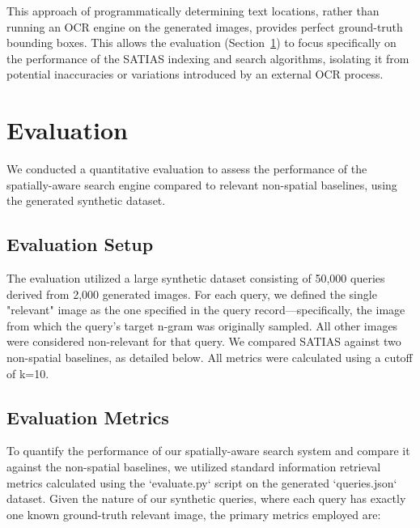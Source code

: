 \documentclass[sigconf,screen]{acmart}
\begin{document}
This approach of programmatically determining text locations, rather than running an OCR engine on the generated images, provides perfect ground-truth bounding boxes. This allows the evaluation (Section~\ref{sec:evaluation}) to focus specifically on the performance of the SATIAS indexing and search algorithms, isolating it from potential inaccuracies or variations introduced by an external OCR process.

\section{Evaluation}
\label{sec:evaluation}

We conducted a quantitative evaluation to assess the performance of the spatially-aware search engine compared to relevant non-spatial baselines, using the generated synthetic dataset.

\subsection{Evaluation Setup}

The evaluation utilized a large synthetic dataset consisting of 50,000 queries derived from 2,000 generated images. For each query, we defined the single "relevant" image as the one specified in the query record—specifically, the image from which the query's target n-gram was originally sampled. All other images were considered non-relevant for that query. We compared SATIAS against two non-spatial baselines, as detailed below. All metrics were calculated using a cutoff of k=10.

\subsection{Evaluation Metrics}
\label{sec:evaluation_metrics}

To quantify the performance of our spatially-aware search system and compare it against the non-spatial baselines, we utilized standard information retrieval metrics calculated using the `evaluate.py` script on the generated `queries.json` dataset. Given the nature of our synthetic queries, where each query has exactly one known ground-truth relevant image, the primary metrics employed are:
\end{document}
